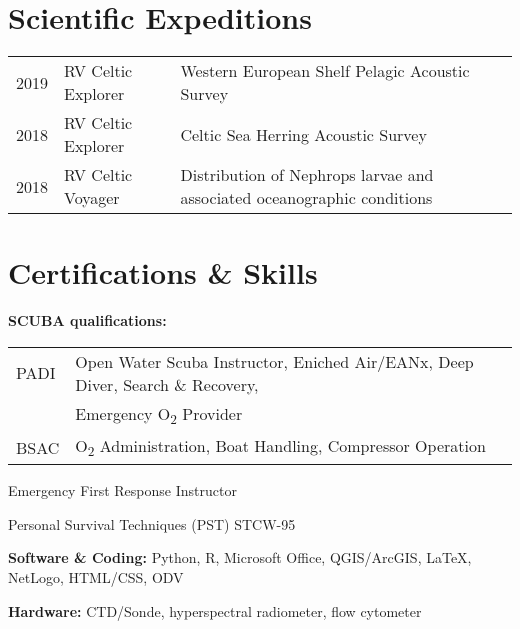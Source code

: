 \documentclass[a4paper]{deedy-resume} %
\begin{document}
\begin{flushleft}
\begin{tabular}{ l l l }
\end{tabular}

\sectionspace %



\sectionspace %

\section{Scientific Expeditions}

\begin{tabular}{l l l}
2019 & RV Celtic Explorer & Western European Shelf Pelagic Acoustic Survey \\
2018 & RV Celtic Explorer & Celtic Sea Herring Acoustic Survey \\
2018 & RV Celtic Voyager & Distribution of Nephrops larvae and associated oceanographic conditions \\
\end{tabular}

\sectionspace %

\end{flushleft}



\section{Certifications \& Skills}
\sectionspace

\begin{tightitemize}
\item \textbf{SCUBA qualifications:}  \\
\begin{tabular}{ l l }
PADI & Open Water Scuba Instructor, Eniched Air/EANx, Deep Diver, Search \& Recovery,  \\
 & Emergency O\textsubscript{2} Provider \\
BSAC & O\textsubscript{2} Administration, Boat Handling, Compressor Operation
\end{tabular}
\item Emergency First Response Instructor
\item Personal Survival Techniques (PST) STCW-95
\item \textbf{Software \& Coding:} Python, R, Microsoft Office, QGIS/ArcGIS,  \LaTeX, NetLogo, HTML/CSS, ODV
\item \textbf{Hardware:} CTD/Sonde, hyperspectral radiometer, flow cytometer
\end{tightitemize}

\sectionspace %


\end{document}

